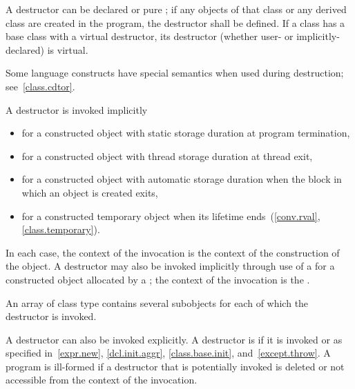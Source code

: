 \pnum
{}%
%
A destructor can be declared
or pure
;
if any objects of that class or any derived class are created in the program,
the destructor shall be defined.
If a class has a base class with a virtual destructor, its  destructor
(whether user- or implicitly-declared) is virtual.

\pnum
\begin{note}
%
Some language constructs have special semantics when used during destruction;
see~\ref{class.cdtor}.
\end{note}

\pnum
{}%
%
A destructor is invoked implicitly

\begin{itemize}

\item for a constructed object with static storage duration at program termination,

\item for a constructed object with thread storage duration at thread exit,

\item for a constructed object with automatic storage duration when the block in which an object is created exits,

\item for a constructed temporary object when its lifetime ends~(\ref{conv.rval}, \ref{class.temporary}).
\end{itemize}

%
%
In each case, the context of the invocation is the context of the construction of
the object. A destructor may also be invoked implicitly through use of a
 for a constructed object allocated
by a ; the context of the invocation is the
.
\begin{note} An array of class type contains several subobjects for each of which
the destructor is invoked. \end{note}
A destructor can also be invoked explicitly. A destructor is 
if it is invoked or as specified in~\ref{expr.new}, \ref{dcl.init.aggr},
\ref{class.base.init}, and~\ref{except.throw}.
A program is ill-formed if a destructor that is potentially invoked is deleted
or not accessible from the context of the invocation.

